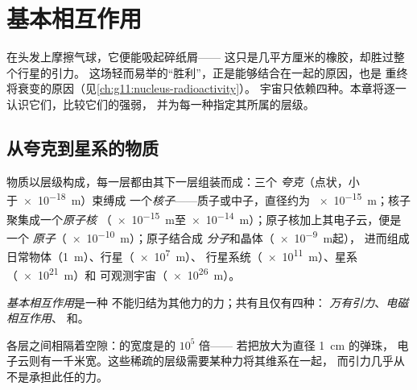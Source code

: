 \chapter{基本相互作用}\label{ch:g11:fundamental-interactions}

在头发上摩擦气球，它便能吸起碎纸屑——
这只是几平方厘米的橡胶，却胜过整个行星的引力。
这场轻而易举的“胜利”，正是能够结合在一起的原因，也是
重终将衰变的原因（见\cref{ch:g11:nucleus-radioactivity}）。
宇宙只依赖四种。本章将逐一认识它们，比较它们的强弱，
并为每一种指定其所属的层级。

\section{从夸克到星系的物质}

\begin{definition}[结构阶梯]\label{def:g11:fundamental-interactions:ladder}
物质以层级构成，每一层都由其下一层组装而成：三个
\emph{夸克}（点状，小于\qty{e-18}{m}）束缚成
一个\emph{核子}——质子或中子，直径约为
\qty{e-15}{m}；核子聚集成一个\emph{原子核}
（\qty{e-15}{m}至\qty{e-14}{m}）；原子核加上其电子云，便是一个
\emph{原子}（\qty{e-10}{m}）；原子结合成
\emph{分子}和晶体（\qty{e-9}{m}起），
进而组成日常物体（\qty{1}{m}）、行星（\qty{e7}{m}）、
行星系统（\qty{e11}{m}）、星系（\qty{e21}{m}）和
可观测宇宙（\qty{e26}{m}）。
\end{definition}

\begin{definition}[四种基本相互作用]\label{def:g11:fundamental-interactions:four}
\emph{基本相互作用}是一种
不能归结为其他力的力；共有且仅有四种：
\emph{万有引力}、\emph{电磁相互作用}、
和。
\end{definition}

\begin{remark}\label{rem:g11:fundamental-interactions:empty}
各层之间相隔着空隙：的宽度是的 $10^{5}$ 倍——
若把放大为直径 \qty{1}{cm} 的弹珠，
电子云则有一千米宽。这些稀疏的层级需要某种力将其维系在一起，
而引力几乎从不是承担此任的力。
\end{remark}

